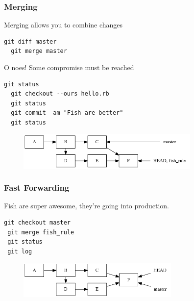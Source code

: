 \documentclass{beamer}
\begin{document}
\begin{frame}[fragile]
\frametitle{Merging}

Merging allows you to combine changes

\vspace{1em}

\begin{lstlisting}[frame=single]
  git diff master
  git merge master
\end{lstlisting}

\vspace{1em}

O noes! Some compromise must be reached

\vspace{1em}

\begin{lstlisting}[frame=single]
  git status
  git checkout --ours hello.rb 
  git status
  git commit -am "Fish are better"
  git status
\end{lstlisting}

\begin{figure}[p]
  \centering
  \includegraphics[height=5em]{merge.png}
\end{figure}

\end{frame}

\begin{frame}[fragile]
\frametitle{Fast Forwarding}

Fish are super awesome, they're going into production.

\vspace{1em}

\begin{lstlisting}[frame=single]
 git checkout master
 git merge fish_rule
 git status
 git log
\end{lstlisting}

\begin{figure}[p]
  \centering
  \includegraphics[height=5em]{fast_forward.png}
\end{figure}

\end{frame}
\end{document}
